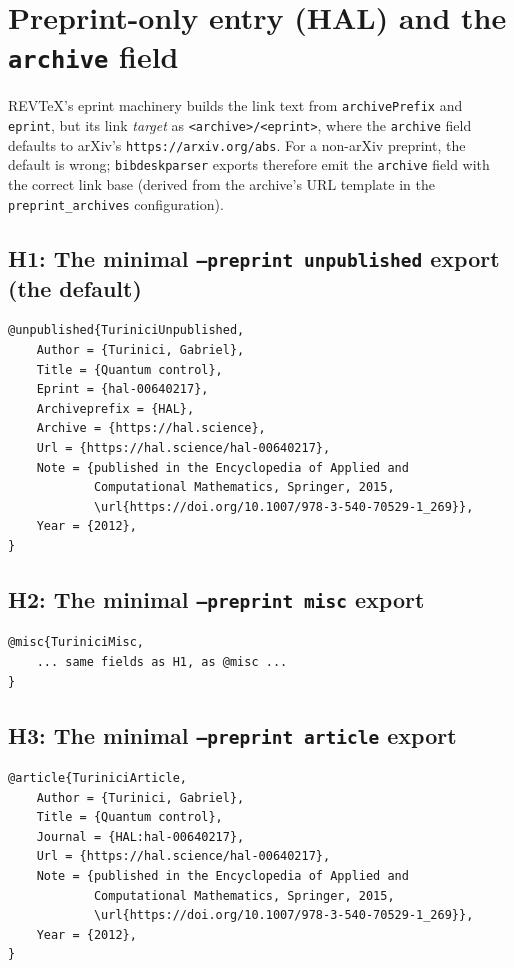 \documentclass[onecolumn, amsmath, amssymb, aps, pra]{revtex4-2}
\begin{document}
\section{Preprint-only entry (HAL) and the \texttt{archive} field}

REVTeX's eprint machinery builds the link text from
\texttt{archivePrefix} and \texttt{eprint}, but its link \emph{target} as
\texttt{<archive>/<eprint>}, where the \texttt{archive} field defaults to
arXiv's \texttt{https://arxiv.org/abs}. For a non-arXiv preprint, the
default is wrong; \texttt{bibdeskparser} exports therefore emit the
\texttt{archive} field with the correct link base (derived from the
archive's URL template in the \texttt{preprint\_archives} configuration).

\subsection{H1: The minimal \texttt{--preprint unpublished} export (the
default)~\cite{TuriniciUnpublished}}

\begin{Verbatim}
@unpublished{TuriniciUnpublished,
    Author = {Turinici, Gabriel},
    Title = {Quantum control},
    Eprint = {hal-00640217},
    Archiveprefix = {HAL},
    Archive = {https://hal.science},
    Url = {https://hal.science/hal-00640217},
    Note = {published in the Encyclopedia of Applied and
            Computational Mathematics, Springer, 2015,
            \url{https://doi.org/10.1007/978-3-540-70529-1_269}},
    Year = {2012},
}
\end{Verbatim}

\subsection{H2: The minimal \texttt{--preprint misc}
export~\cite{TuriniciMisc}}

\begin{Verbatim}
@misc{TuriniciMisc,
    ... same fields as H1, as @misc ...
}
\end{Verbatim}

\subsection{H3: The minimal \texttt{--preprint article}
export~\cite{TuriniciArticle}}

\begin{Verbatim}
@article{TuriniciArticle,
    Author = {Turinici, Gabriel},
    Title = {Quantum control},
    Journal = {HAL:hal-00640217},
    Url = {https://hal.science/hal-00640217},
    Note = {published in the Encyclopedia of Applied and
            Computational Mathematics, Springer, 2015,
            \url{https://doi.org/10.1007/978-3-540-70529-1_269}},
    Year = {2012},
}
\end{Verbatim}
\end{document}
